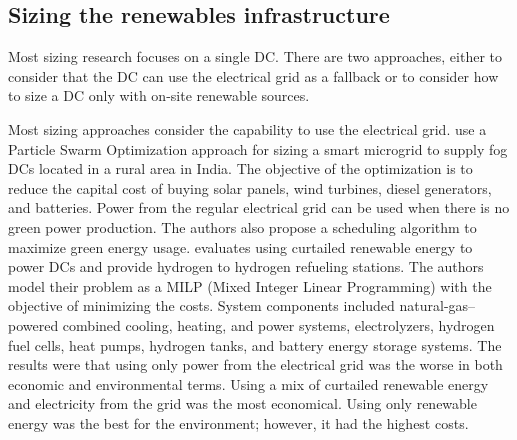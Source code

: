 \subsection{Sizing the renewables infrastructure}

\label{sec:sizing}


Most sizing research focuses on a single DC. There are two approaches, either to consider that the DC can use the electrical grid as a fallback or to consider how to size a DC only with on-site renewable sources.

Most sizing approaches consider the capability to use the electrical grid. %
\cite{padma2021_fogdcs_rural} use a Particle Swarm Optimization approach for sizing a smart microgrid to supply fog DCs located in a rural area in India. The objective of the optimization is to reduce the capital cost of buying solar panels, wind turbines, diesel generators, and batteries. Power from the regular electrical grid can be used when there is no green power production. The authors also propose a scheduling algorithm to maximize green energy usage.
%
\citet{Niaz2022_curtailment} evaluates using curtailed renewable energy to power DCs and provide hydrogen to hydrogen refueling stations. The authors model their problem as a MILP (Mixed Integer Linear Programming) with the objective of minimizing the costs. System components included natural-gas–powered combined cooling, heating, and power systems, electrolyzers, hydrogen fuel cells, heat pumps, hydrogen tanks, and battery energy storage systems. The results were that using only power from the electrical grid was the worse in both economic and environmental terms. Using a mix of curtailed renewable energy and electricity from the grid was the most economical. Using only renewable energy was the best for the environment; however, it had the highest costs.

